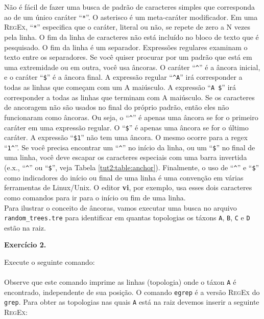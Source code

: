 \begin{refsection}
Não é fácil de fazer uma busca de padrão de caracteres simples que corresponda ao de um único caráter ``\texttt{*}''. O asterisco é um meta-caráter modificador. Em uma \textsc{RegEx}, ``\texttt{*}'' especifica que o caráter, literal ou não, se repete de zero a N vezes pela linha. O fim da linha de caracteres não está incluído no bloco de texto que é pesquisado. O fim da linha é um separador. Expressões regulares examinam o texto entre os separadores. Se você quiser procurar por um padrão que está em uma extremidade ou em outra, você usa âncoras. O caráter ``\texttt{\^{}}'' é a âncora inicial, e o caráter ``\texttt{\$}'' é a âncora final. A expressão regular ``\texttt{\^{}A}'' irá corresponder a todas as linhas que começam com um A maiúsculo. A expressão ``\texttt{A \$}'' irá corresponder a todas as linhas que terminam com A maiúsculo. Se os caracteres de ancoragem não são usados no final do próprio padrão, então eles não funcionaram como âncoras. Ou seja, o ``\texttt{\^{}}'' é apenas uma âncora se for o 
primeiro caráter em uma expressão regular. O ``\texttt{\$}'' é apenas uma âncora se for o último caráter. A expressão ``\texttt{\$1}'' não tem uma âncora. O mesmo ocorre para a regex ``\texttt{1\^{}}''. Se você precisa encontrar um ``\texttt{\^{}}'' no início da linha, ou um ``\texttt{\$}'' no final de uma linha, você deve escapar os caracteres especiais com uma barra invertida (e.x., ``\texttt{\^{}}'' ou ``\texttt{\$}'', veja Tabela \ref{tut2:table:anchor}). Finalmente, o uso de ``\texttt{\^{}}'' e ``\texttt{\$}'' como indicadores do início ou final de uma linha é uma convenção em várias ferramentas de Linux/Unix. O editor \textbf{vi}, por exemplo, usa esses dois caracteres como comandos para ir para o início ou fim de uma linha.\\

Para ilustrar o conceito de âncoras, vamos executar uma busca no arquivo \texttt{random\_trees.tre} para identificar em quantas topologias os táxons \texttt{A}, \texttt{B}, \texttt{C} e \texttt{D} estão na raiz.\\

\begin{blackBlock}{\textbf{Exercício 2.}}\label{tut2:ex:2.\arabic{ex}}

Execute o seguinte comando:\\
\\

Observe que este comando imprime as linhas (topologia) onde o táxon \texttt{A} é encontrado, independente de sua posição. O comando \texttt{egrep} é a versão \textsc{RegEx} do \texttt{grep}. Para obter as topologias nas quais \texttt{A} está na raiz devemos inserir a seguinte \textsc{RegEx}:\\
\\


\end{blackBlock}
\end{refsection}
